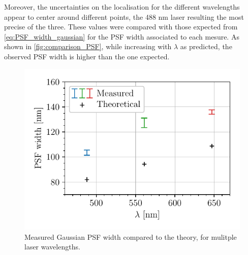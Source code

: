 Moreover, the uncertainties on the localisation for the different wavelengths appear to center around different points, the 488 nm laser resulting the most precise of the three.
These values were compared with those expected from \autoref{eq:PSF_width_gaussian} for the PSF width associated to each mesure.
As shown in \autoref{fig:comparison_PSF}, while increasing with $\lambda$ as predicted,
the observed PSF width is higher than the one expected.
\begin{figure}[htbp]
    \centering
    \includegraphics[scale=1]{figures/comparison_PSF.pdf}
    \caption{Measured Gaussian PSF width compared to the theory, for mulitple laser wavelengths.}
    \label{fig:comparison_PSF}
\end{figure}


